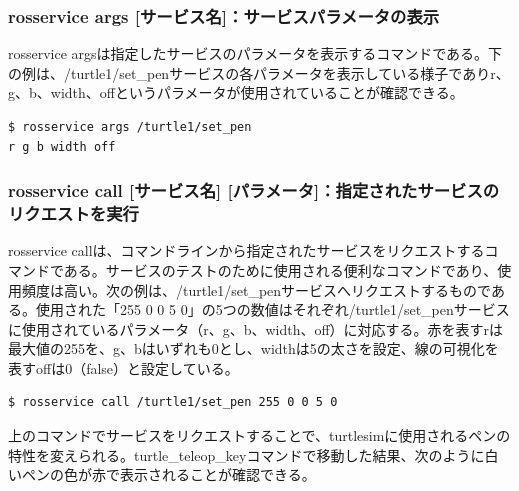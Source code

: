 \subsubsection{rosservice args [サービス名]：サービスパラメータの表示}

rosservice argsは指定したサービスのパラメータを表示するコマンドである。下の例は、/turtle1/set\_penサービスの各パラメータを表示している様子でありr、g、b、width、offというパラメータが使用されていることが確認できる。

\begin{lstlisting}[language=ROS]
$ rosservice args /turtle1/set_pen
r g b width off
\end{lstlisting}

\subsubsection{rosservice call [サービス名] [パラメータ]：指定されたサービスのリクエストを実行}

rosservice callは、コマンドラインから指定されたサービスをリクエストするコマンドである。サービスのテストのために使用される便利なコマンドであり、使用頻度は高い。次の例は、/turtle1/set\_penサービスへリクエストするものである。使用された「255 0 0 5 0」の5つの数値はそれぞれ/turtle1/set\_penサービスに使用されているパラメータ（r、g、b、width、off）に対応する。赤を表すrは最大値の255を、g、bはいずれも0とし、widthは5の太さを設定、線の可視化を表すoffは0（false）と設定している。

\begin{lstlisting}[language=ROS]
$ rosservice call /turtle1/set_pen 255 0 0 5 0
\end{lstlisting}

上のコマンドでサービスをリクエストすることで、turtlesimに使用されるペンの特性を変えられる。turtle\_teleop\_keyコマンドで移動した結果、次のように白いペンの色が赤で表示されることが確認できる。

